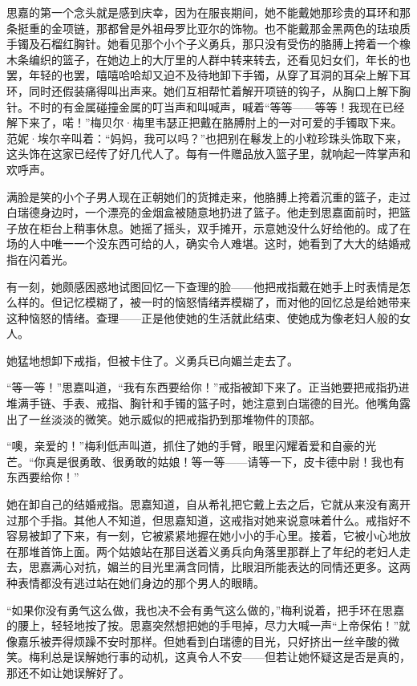 \par 思嘉的第一个念头就是感到庆幸，因为在服丧期间，她不能戴她那珍贵的耳环和那条挺重的金项链，那都曾是外祖母罗比亚尔的饰物。也不能戴那金黑两色的珐琅质手镯及石榴红胸针。她看见那个小个子义勇兵，那只没有受伤的胳膊上挎着一个橡木条编织的篮子，在她边上的大厅里的人群中转来转去，还看见妇女们，年长的也罢，年轻的也罢，嘻嘻哈哈却又迫不及待地卸下手镯，从穿了耳洞的耳朵上解下耳环，同时还假装痛得叫出声来。她们互相帮忙着解开项链的钩子，从胸口上解下胸针。不时的有金属碰撞金属的叮当声和叫喊声，喊着“等等——等等！我现在已经解下来了，喏！”梅贝尔·梅里韦瑟正把戴在胳膊肘上的一对可爱的手镯取下来。范妮·埃尔辛叫着：“妈妈，我可以吗？”也把别在鬈发上的小粒珍珠头饰取下来，这头饰在这家已经传了好几代人了。每有一件赠品放入篮子里，就响起一阵掌声和欢呼声。
\par 满脸是笑的小个子男人现在正朝她们的货摊走来，他胳膊上挎着沉重的篮子，走过白瑞德身边时，一个漂亮的金烟盒被随意地扔进了篮子。他走到思嘉面前时，把篮子放在柜台上稍事休息。她摇了摇头，双手摊开，示意她没什么好给他的。成了在场的人中唯一一个没东西可给的人，确实令人难堪。这时，她看到了大大的结婚戒指在闪着光。
\par 有一刻，她颇感困惑地试图回忆一下查理的脸——他把戒指戴在她手上时表情是怎么样的。但记忆模糊了，被一时的恼怒情绪弄模糊了，而对他的回忆总是给她带来这种恼怒的情绪。查理——正是他使她的生活就此结束、使她成为像老妇人般的女人。
\par 她猛地想卸下戒指，但被卡住了。义勇兵已向媚兰走去了。
\par “等一等！”思嘉叫道，“我有东西要给你！”戒指被卸下来了。正当她要把戒指扔进堆满手链、手表、戒指、胸针和手镯的篮子时，她注意到白瑞德的目光。他嘴角露出了一丝淡淡的微笑。她示威似的把戒指扔到那堆物件的顶部。
\par “噢，亲爱的！”梅利低声叫道，抓住了她的手臂，眼里闪耀着爱和自豪的光芒。“你真是很勇敢、很勇敢的姑娘！等一等——请等一下，皮卡德中尉！我也有东西要给你！”
\par 她在卸自己的结婚戒指。思嘉知道，自从希礼把它戴上去之后，它就从来没有离开过那个手指。其他人不知道，但思嘉知道，这戒指对她来说意味着什么。戒指好不容易被卸了下来，有一刻，它被紧紧地握在她小小的手心里。接着，它被小心地放在那堆首饰上面。两个姑娘站在那目送着义勇兵向角落里那群上了年纪的老妇人走去，思嘉满心对抗，媚兰的目光里满含同情，比眼泪所能表达的同情还更多。这两种表情都没有逃过站在她们身边的那个男人的眼睛。
\par “如果你没有勇气这么做，我也决不会有勇气这么做的，”梅利说着，把手环在思嘉的腰上，轻轻地按了按。思嘉突然想把她的手甩掉，尽力大喊一声“上帝保佑！”就像嘉乐被弄得烦躁不安时那样。但她看到白瑞德的目光，只好挤出一丝辛酸的微笑。梅利总是误解她行事的动机，这真令人不安——但若让她怀疑这是否是真的，那还不如让她误解好了。
